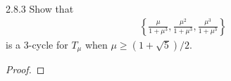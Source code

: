 \begin{problem}{2.8.3}
  Show that
  \begin{align*}
    \left\{\frac{\mu}{1+\mu^3}, \frac{\mu^2}{1+\mu^3}, \frac{\mu^3}{1+\mu^3}\right\}
  \end{align*}
  is a 3-cycle for $T_\mu$ when $\mu \geq (1+\sqrt{5})/2$.
\end{problem}

\begin{proof}
\end{proof}
\newpage
